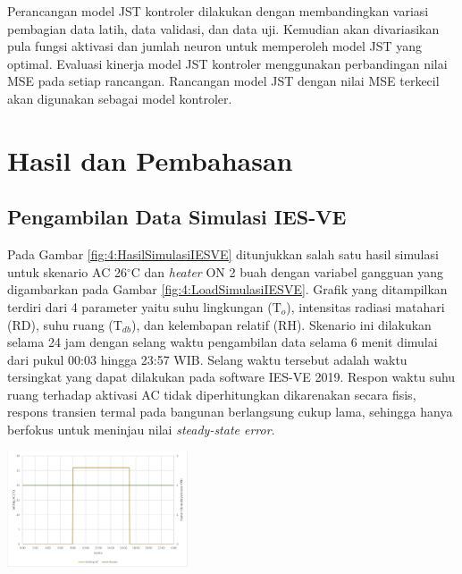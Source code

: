 \documentclass[a4paper,10pt]{article}
\makeatletter
\newenvironment{body}{\begin{multicols}{2}}{\end{multicols}}
\renewenvironment{figure}
{\def\@captype{figure}%
	\captionsetup{labelsep=period,format=hang,font=footnotesize,justification=justified}
}
{}
\makeatother
\begin{document}
\begin{body}
		Perancangan model JST kontroler dilakukan dengan membandingkan variasi pembagian data latih, data validasi, dan data uji. Kemudian akan divariasikan pula fungsi aktivasi dan jumlah neuron untuk memperoleh model JST yang optimal. Evaluasi kinerja model JST kontroler menggunakan perbandingan nilai MSE pada setiap rancangan. Rancangan model JST dengan nilai MSE terkecil akan digunakan sebagai model kontroler.\\
		
		\section{Hasil dan Pembahasan}
		
		\subsection{Pengambilan Data Simulasi IES-VE}
		
		Pada Gambar \ref{fig:4:HasilSimulasiIESVE} ditunjukkan salah satu hasil simulasi untuk skenario AC 26$^\circ$C dan \textit{heater} ON 2 buah dengan variabel gangguan yang digambarkan pada Gambar \ref{fig:4:LoadSimulasiIESVE}. Grafik yang ditampilkan terdiri dari 4 parameter yaitu suhu lingkungan (T$_o$), intensitas radiasi matahari (RD), suhu ruang (T$_{db}$), dan kelembapan relatif (RH). Skenario ini dilakukan selama 24 jam dengan selang waktu pengambilan data selama 6 menit dimulai dari pukul 00:03 hingga 23:57 WIB. Selang waktu tersebut adalah waktu tersingkat yang dapat dilakukan pada software IES-VE 2019. Respon waktu suhu ruang terhadap aktivasi AC tidak diperhitungkan dikarenakan secara fisis, respons transien termal pada bangunan berlangsung cukup lama, sehingga hanya berfokus untuk meninjau nilai \textit{steady-state error}.\\
		
		\begin{figure}
			\centering
			\includegraphics[width=0.4\textwidth]{figures/ACHTSimulasiIESVE}
			\caption{Data Konfigurasi AC dan \textit{Heater} pada Simulasi ISE-VE}
			\label{fig:4:ACHTSimulasiIESVE}
		\end{figure}
		

\end{body}
\end{document}
